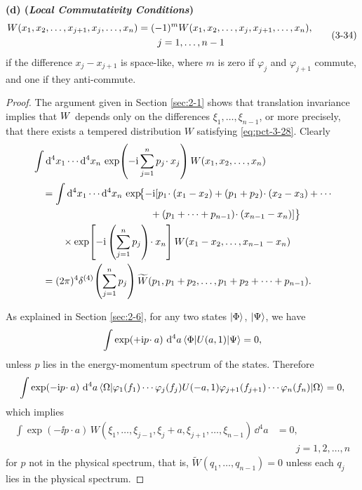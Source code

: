 \begin{theorem}
\textbf{(d) (\emph{Local Commutativity Conditions})}
\begin{equation}
 \begin{aligned}
 W(x_1,x_2,\ldots,x_{j+1},x_j,\ldots,x_n)
 &=(-1)^mW(x_1,x_2,\ldots,x_j,x_{j+1},\ldots,x_n),\\
 &\qquad j=1,\ldots,n-1
 \end{aligned}
 \tag{3-34}\label{eq:pct-3-34}
\end{equation}
if the difference $x_j-x_{j+1}$ is space-like, where $m$ is zero if
$\varphi_j$ and $\varphi_{j+1}$ commute, and one if they anti-commute.
\end{theorem}

\begin{proof}
The argument given in Section \ref{sec:2-1} shows that translation invariance implies
that $W$ depends only on the differences
$\xi_1,\ldots,\xi_{n-1}$, or more precisely, that there exists a tempered
distribution $W$ satisfying \eqref{eq:pct-3-28}. Clearly
\begin{align*}
 &\int \dd^4x_1\cdots\dd^4x_n\,
 \exp\!\left(-\ii\sum_{j=1}^{n}p_j\!\cdot x_j\right)
 \Wightman(x_1,x_2,\ldots,x_n) \\
 &\quad=\int \dd^4x_1\cdots\dd^4x_n\,
 \exp\!\bigl\{-\ii[p_1\!\cdot(x_1-x_2)
 +(p_1+p_2)\!\cdot(x_2-x_3)+\cdots \\
 &\hspace{42mm}+(p_1+\cdots+p_{n-1})\!\cdot(x_{n-1}-x_n)]\bigr\} \\
 &\qquad\quad\times\exp\!\left[-\ii\left(\sum_{j=1}^{n}p_j\right)\!\cdot x_n\right]
 W(x_1-x_2,\ldots,x_{n-1}-x_n) \\
 &\quad=(2\pi)^4\delta^{(4)}\!\left(\sum_{j=1}^{n}p_j\right)
 \widetilde{W}(p_1,p_1+p_2,\ldots,p_1+p_2+\cdots+p_{n-1}).
\end{align*}

As explained in Section \ref{sec:2-6}, for any two states $\lvert \Phi\rangle$, $\lvert \Psi\rangle$,
we have
\begin{equation*}
 \int \exp(+\mathrm{i} p\!\cdot a)\,\mathop{}\!\mathrm{d}^4a\,
 \langle \Phi\rvert U(a,1)\lvert \Psi\rangle=0,
\end{equation*}
unless $p$ lies in the energy-momentum spectrum of the states. Therefore
\begin{equation*}
 \int \exp(-\mathrm{i} p\!\cdot a)\,\mathop{}\!\mathrm{d}^4a\,
 \langle \Omega\rvert\varphi_1(f_1)\cdots\varphi_j(f_j)U(-a,1)
 \varphi_{j+1}(f_{j+1})\cdots\varphi_n(f_n)\lvert \Omega\rangle=0,
\end{equation*}
which implies
\begin{equation*}
 \begin{aligned}
  \int \exp(-\ii p\!\cdot a)\,
  W(\xi_1,\ldots,\xi_{j-1},\xi_j+a,\xi_{j+1},\ldots,\xi_{n-1})\,\dd^4a&=0,\\[-2pt]
  &\qquad j=1,2,\ldots,n
 \end{aligned}
\end{equation*}
for $p$ not in the physical spectrum, that is,
$\widetilde{W}(q_1,\ldots,q_{n-1})=0$ unless each $q_j$ lies in the physical
spectrum.


\end{proof}
